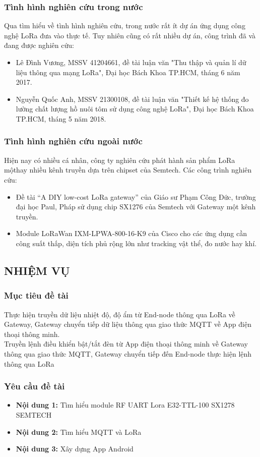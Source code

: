 \subsubsection{Tình hình nghiên cứu trong nước}
Qua tìm hiểu về tình hình nghiên cứu, trong nước rất ít dự án ứng dụng công nghệ LoRa đưa vào thực tế. Tuy nhiên cũng có rất nhiều dự án, công trình đã và đang được nghiên cứu:
\begin{itemize}
	\item Lê Đình Vương, MSSV 41204661, đề tài luận văn "Thu thập và quản lí dữ liệu thông qua mạng LoRa", Đại học Bách Khoa TP.HCM, tháng 6 năm 2017.
	\item Nguyễn Quốc Anh, MSSV 21300108, đề tài luận văn "Thiết kế hệ thống đo lường chất lượng hồ nuôi tôm sử dụng công nghệ LoRa", Đại học Bách Khoa TP.HCM, tháng 5 năm 2018.
\end{itemize}
\subsubsection{Tình hình nghiên cứu ngoài nước}
Hiện nay có nhiều cá nhân, công ty nghiên cứu phát hành sản phẩm LoRa mộthay nhiều kênh truyền dựa trên chipset của Semtech. Các công trình nghiên cứu:
\begin{itemize}
	\item Đề tài “A DIY low-cost LoRa gateway” của Giáo sư Phạm Công Đức, trường đại học Paul, Pháp sử dụng chip SX1276 của Semtech với Gateway một kênh truyền.
	\item Module LoRaWan IXM-LPWA-800-16-K9 của Cisco cho các ứng dụng cần công suất thấp, diện tích phủ rộng lớn như tracking vật thể, đo nước hay khí.
\end{itemize}
\subsection{NHIỆM VỤ}
\subsubsection{Mục tiêu đề tài}
Thực hiện truyền dữ liệu nhiệt độ, độ ẩm từ End-node thông qua LoRa về Gateway, Gateway chuyển tiếp dữ liệu thông qua giao thức MQTT về App điện thoại thông minh.\\
\indent Truyền lệnh điều khiển bật/tắt đèn từ App điện thoại thông minh về Gateway thông qua giao thức MQTT, Gateway chuyển tiếp đến End-node thực hiện lệnh thông qua LoRa
\subsubsection{Yêu cầu đề tài}
\begin{itemize}
	\item \textbf{Nội dung 1:} Tìm hiểu module RF UART Lora E32-TTL-100 SX1278 SEMTECH
	\item \textbf{Nội dung 2:} Tìm hiểu MQTT và LoRa
	\item \textbf{Nội dung 3:} Xây dựng App Android
\end{itemize}
